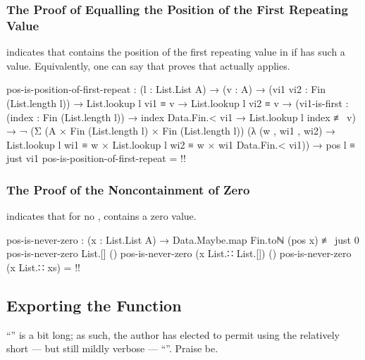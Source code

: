 \documentclass{report}
\begin{document}
\subsubsection{The Proof of Equalling the Position of the First Repeating Value}
 indicates that   contains the position of the first repeating value in  if  has such a value.  Equivalently, one can say that  proves that  actually applies.\label{sec:firstRepeatPosition-isFirst}

\begin{code}
    pos-is-position-of-first-repeat :
      (l : List.List A) →
      (v : A) →
      (vi1 vi2 : Fin (List.length l)) →
      List.lookup l vi1 ≡ v →
      List.lookup l vi2 ≡ v →
      (vi1-is-first : (index : Fin (List.length l)) →
                      index Data.Fin.< vi1 →
                      List.lookup l index ≢ v) →
      ¬ (Σ (A × Fin (List.length l) × Fin (List.length l))
           (λ (w , wi1 , wi2) →
                List.lookup l wi1 ≡ w
              × List.lookup l wi2 ≡ w
              × wi1 Data.Fin.< vi1)) →
      pos l ≡ just vi1
    pos-is-position-of-first-repeat = {!!}
\end{code}

\subsubsection{The Proof of the Noncontainment of Zero}
 indicates that for no ,   contains a zero value.

\begin{code}
    pos-is-never-zero :
      (x : List.List A) →
      Data.Maybe.map Fin.toℕ (pos x) ≢ just 0
    pos-is-never-zero List.[] ()
    pos-is-never-zero (x List.∷ List.[]) ()
    pos-is-never-zero (x List.∷ xs) = {!!}
\end{code}

\subsection{Exporting the Function}
``'' is a bit long; as such, the author has elected to permit using the relatively short --- but still mildly verbose --- ``''.  Praise be.
\end{document}
